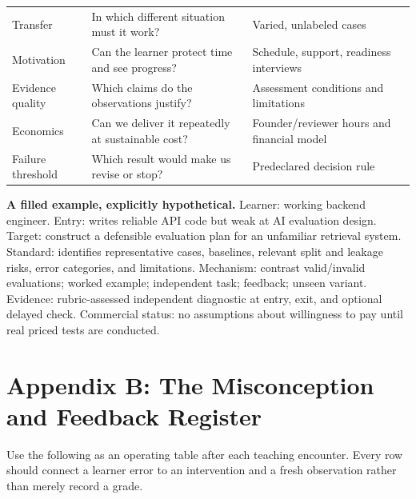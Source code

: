 \begin{table}[t]
\begin{tabularx}{\textwidth}{p{}p{}X}
Transfer & In which different situation must it work? & Varied, unlabeled cases \\
Motivation & Can the learner protect time and see progress? & Schedule, support, readiness interviews \\
Evidence quality & Which claims do the observations justify? & Assessment conditions and limitations \\
Economics & Can we deliver it repeatedly at sustainable cost? & Founder/reviewer hours and financial model \\
Failure threshold & Which result would make us revise or stop? & Predeclared decision rule \\
\bottomrule
\end{tabularx}
\end{table}

\textbf{A filled example, explicitly hypothetical.} Learner: working backend engineer. Entry: writes reliable API code but weak at AI evaluation design. Target: construct a defensible evaluation plan for an unfamiliar retrieval system. Standard: identifies representative cases, baselines, relevant split and leakage risks, error categories, and limitations. Mechanism: contrast valid/invalid evaluations; worked example; independent task; feedback; unseen variant. Evidence: rubric-assessed independent diagnostic at entry, exit, and optional delayed check. Commercial status: no assumptions about willingness to pay until real priced tests are conducted.

\section*{Appendix B: The Misconception and Feedback Register}

Use the following as an operating table after each teaching encounter. Every row should connect a learner error to an intervention and a fresh observation rather than merely record a grade.

